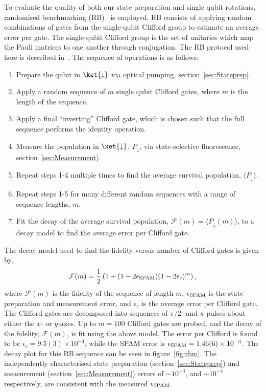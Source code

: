     To evaluate the quality of both our
    state preparation and single qubit rotations, randomised benchmarking
    (RB)~\cite{knill2008randomized} is employed.  RB consists of
    applying random combinations of gates from the single-qubit Clifford group to
    estimate an average error per gate. The single-qubit Clifford group is
    the set of unitaries which map the Pauli matrices to one another through
    conjugation. The RB protocol used here is described in~\cite{hughes2021benchmarking}.
    The sequence of operations is as follows:
    \begin{enumerate}
        \item Prepare the qubit in $\ket{\downarrow}$ via optical pumping, section~\ref{sec:Stateprep}.
        \item Apply a random sequence of $m$ single qubit Clifford gates, where $m$ is the length of the sequence.
        \item Apply a final ``inverting'' Clifford gate, which is chosen such that the full sequence performs the identity operation.
        \item Measure the population in $\ket{\downarrow}$, $P_\downarrow$, via state-selective fluorescence, section~\ref{sec:Measurement}.
        \item Repeat steps 1-4 multiple times to find the average survival population, $\langle P_\downarrow \rangle$.
        \item Repeat steps 1-5 for many different random sequences with a range of sequence lengths, $m$.
        \item Fit the decay of the average survival population, $\mathcal{F}(m) = \langle P_\downarrow(m) \rangle$, to a decay model to find the average error per Clifford gate.
    \end{enumerate}
    The decay model used to find 
    the fidelity versus number of Clifford gates is given by\cite{hughes2021benchmarking},
    \begin{equation}
    \label{eq:RBM_decay}
        \mathcal{F}(m) = \frac{1}{2}\left( 1+(1-2\epsilon_{\rm SPAM})(1-2\epsilon_c)^m\right),
    \end{equation}
    where $\mathcal{F}(m)$ is the fidelity of the sequence of length $m$,
    $\epsilon_{\rm SPAM}$ is the state preparation and measurement error, and
    $\epsilon_c$ is the average error per Clifford gate.  The Clifford gates are decomposed into
    sequences of $\pi/2$- and $\pi$-pulses about either the $x$- or $y$-axes. Up to $m=100$ Clifford gates are probed, and the decay of the fidelity, $\mathcal{F}(m)$, is fit using the above model.
    The error per Clifford is found to be $\epsilon_c = 9.5(3) \times 10^{-4}$,
    while the SPAM error is $\epsilon_{\rm SPAM} = 1.46(6) \times 10^{-3}$. The decay plot for
    this RB sequence can be seen in figure~\ref{fig:rbm}.
    The independently characterised state preparation (section~\ref{sec:Stateprep}) and measurement (section~\ref{sec:Measurement}) errors of $\sim 10^{-3}$, and $\sim 10^{-4}$ respectively, are consistent with the measured $\epsilon_{\rm SPAM}$.

